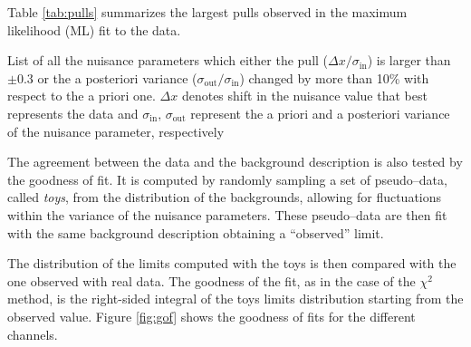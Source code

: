 Table \ref{tab:pulls} summarizes the largest pulls observed in the maximum likelihood (ML) fit to the data.

\begin{table}

\caption{List of all the nuisance parameters which either the pull ($\Delta x/\sigma_{\text{in}}$) is larger than $\pm0.3$ or the a posteriori variance ($\sigma_{\text{out}}/\sigma_{\text{in}}$) changed by more than 10\% with respect to the a priori one. $\Delta x$ denotes shift in the nuisance value that best represents the data and $\sigma_{\text{in}}, \,\sigma_{\text{out}}$ represent the a priori and a posteriori variance of the nuisance parameter, respectively}
\label{tab:pulls}
\end{table}

The agreement between the data and the background description is also tested by the goodness of fit. It is computed by randomly sampling a set of pseudo--data, called \emph{toys}, from the distribution of the backgrounds, allowing for fluctuations within the variance of the nuisance parameters. These pseudo--data are then fit with the same background description obtaining a ``observed'' limit. 

The distribution of the limits computed with the toys is then compared with the one observed with real data. The goodness of the fit, as in the case of the $\chi^2$ method, is the right-sided integral of the toys limits distribution starting from the observed value. Figure \ref{fig:gof} shows the goodness of fits for the different channels.

